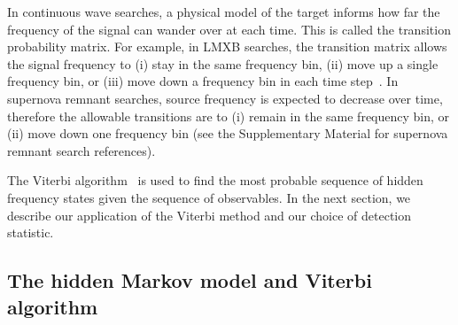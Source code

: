 \documentclass[paper-main.tex]{subfiles}
\begin{document}
In continuous wave searches, a physical model of the target informs how far the frequency of the signal can wander over at each time. 
This is called the transition probability matrix. 
For example, in LMXB searches, the transition matrix allows the signal frequency to (i) stay in the same frequency bin, (ii) move up a single frequency bin, or (iii) move down a frequency bin in each time step~\cite{ScoX1O2Viterbi:2019}. 
In supernova remnant searches, source frequency is expected to decrease over time, therefore the allowable transitions are to (i) remain in the same frequency bin, or (ii) move down one frequency bin (see the Supplementary Material for supernova remnant search references). 


The Viterbi algorithm~\cite{Viterbi:1967} is used to find the most probable sequence of hidden frequency states given the sequence of observables.
In the next section, we describe our application of the Viterbi method and our choice of detection statistic. 




\subsection{The hidden Markov model and Viterbi algorithm}
\label{sec:viterbi}
\end{document}
